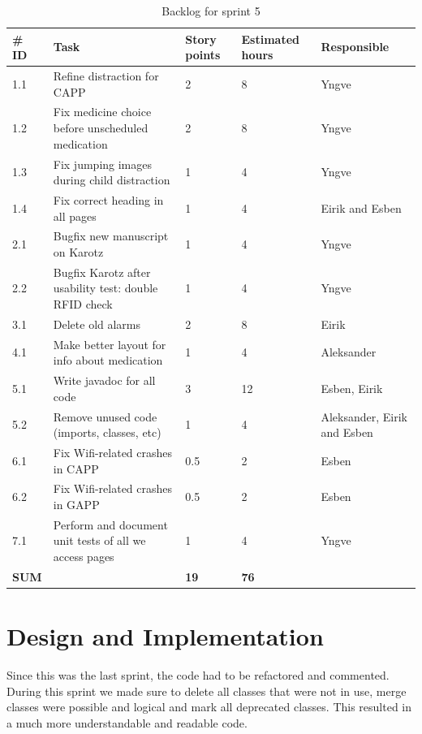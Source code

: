 \begin{table}
	\begin{center}
		\begin{tabular}{|p{2.0cm}| p{8.0cm}| p{2.0cm}|p{2.0cm}|p{2.0cm}|}
			\hline
			\#  ID 	& Task 	& Story points 	& Estimated hours & Responsible \\
			\hline
 			1.1 & Refine distraction for CAPP & 2 & 8 & Yngve\\
 			\hline
 			1.2 & Fix medicine choice before unscheduled medication & 2 & 8 &Yngve\\
 			\hline
 			1.3 & Fix jumping images during child distraction & 1 & 4 & Yngve\\
 			\hline
 			1.4 & Fix correct heading in all pages & 1 & 4 & Eirik and Esben\\
 			\hline
 			2.1 & Bugfix new manuscript on Karotz & 1 & 4 & Yngve\\
 			\hline
 			2.2 & Bugfix Karotz after usability test: double RFID check & 1 & 4 & Yngve\\
  			\hline
 			3.1 & Delete old alarms & 2 & 8 & Eirik\\
 			\hline
 			4.1 & Make better layout for info about medication & 1 & 4 & Aleksander\\
 			\hline
 			5.1 & Write javadoc for all code & 3 & 12 & Esben, Eirik\\
 			\hline
 			5.2 & Remove unused code (imports, classes, etc) & 1 & 4 & Aleksander, Eirik and Esben \\
 			\hline
 			6.1 & Fix Wifi-related crashes in CAPP & 0.5 & 2 & Esben \\
 			\hline
 			6.2 & Fix Wifi-related crashes in GAPP & 0.5 & 2 & Esben \\
 			\hline
 			7.1 & Perform and document unit tests of all we access pages & 1 & 4 & Yngve \\
 			\hline
 			\bfseries{SUM} & & \bfseries{19} & \bfseries{76} & \\
 			\hline
 			\hline
		\end{tabular}
	\end{center}
	\caption{Backlog for sprint 5}
\end{table}

\section{Design and Implementation}
\label{sec:sprint5designAndImplementation}
Since this was the last sprint, the code had to be refactored and commented. During this sprint we made sure to delete all classes that were not in use, merge classes were possible and logical and mark all deprecated classes. This resulted in a much more understandable and readable code. 

